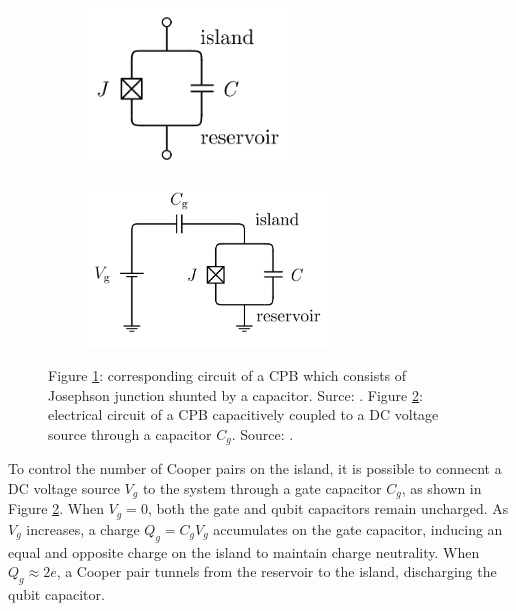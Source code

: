 \begin{figure}[ht!]
    \centering
    \begin{subfigure}{0.45\textwidth}
        \centering
        \includegraphics[width=0.60\textwidth]{figures/png/CPB.png}
        \subcaption{}
        \label{fig:CPB}
    \end{subfigure}
    \hfill
    \begin{subfigure}{0.45\textwidth}
        \centering
        \includegraphics[width=0.70\textwidth]{figures/png/CPB_circuit.png}
        \subcaption{}
        \label{fig:CPB_circuit}
    \end{subfigure}
    \caption{Figure \ref{fig:CPB}: corresponding circuit of a CPB which consists of Josephson junction shunted by a capacitor. Surce: \cite{manenti_quantum_2023}. Figure \ref{fig:CPB_circuit}: electrical circuit of a CPB capacitively coupled to a DC voltage source through a capacitor $C_g$. Source: \cite{manenti_quantum_2023}.}
    \label{fig:CPB_general}
\end{figure}

To control the number of Cooper pairs on the island, it is possible to connecnt a DC voltage source $V_g$ to the system through a gate capacitor $C_g$, as shown in Figure \ref{fig:CPB_circuit}.
When $V_g = 0$, both the gate and qubit capacitors remain uncharged. 
As $V_g$ increases, a charge $Q_g = C_g V_g$ accumulates on the gate capacitor, inducing an equal and opposite charge on the island to maintain charge neutrality. 
When $Q_g \approx 2e$, a Cooper pair tunnels from the reservoir to the island, discharging the qubit capacitor. \\

